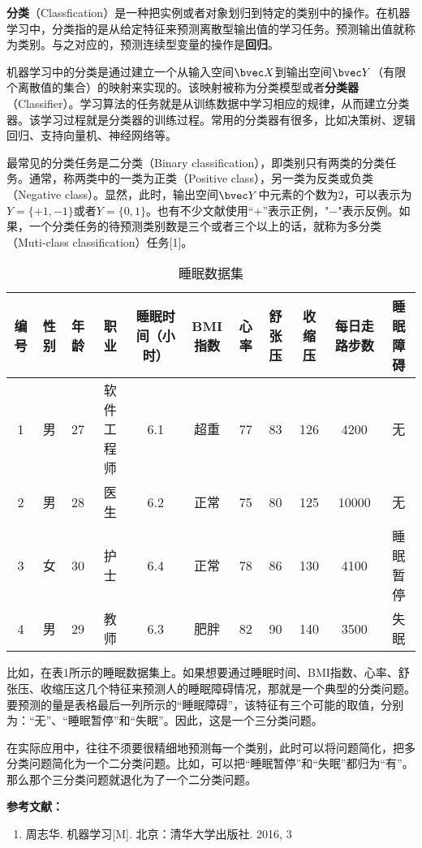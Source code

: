 

\textbf{分类}（Classfication）是一种把实例或者对象划归到特定的类别中的操作。在机器学习中，分类指的是从给定特征来预测离散型输出值的学习任务。预测输出值就称为类别。与之对应的，预测连续型变量的操作是\textbf{回归}。

机器学习中的分类是通过建立一个从输入空间$\bvec X$到输出空间$\bvec Y$（有限个离散值的集合）的映射来实现的。该映射被称为分类模型或者\textbf{分类器}（Classifier）。学习算法的任务就是从训练数据中学习相应的规律，从而建立分类器。该学习过程就是分类器的训练过程。常用的分类器有很多，比如决策树、逻辑回归、支持向量机、神经网络等。

最常见的分类任务是二分类（Binary classification），即类别只有两类的分类任务。通常，称两类中的一类为正类（Positive class），另一类为反类或负类（Negative class）。显然，此时，输出空间$\bvec Y$中元素的个数为$2$，可以表示为$Y=\{+1, -1\}$或者$Y=\{0, 1\}$。也有不少文献使用“$+$”表示正例，"$-$"表示反例。如果，一个分类任务的待预测类别数是三个或者三个以上的话，就称为多分类（Muti-class classification）任务[1]。

\begin{table}[ht]
\centering
\caption{睡眠数据集}\label{tab_Class1}
\begin{tabular}{|c|c|c|c|c|c|c|c|c|c|c|}
\hline
编号 & 性别 & 年龄 & 职业 & 睡眠时间（小时） & BMI指数 & 心率 & 舒张压 & 收缩压 & 每日走路步数 & 睡眠障碍 \\\hline
1 & 男 & 27 & 软件工程师 & 6.1 & 超重 & 77 & 83 & 126 & 4200 & 无 \\
\hline
2 & 男 & 28 & 医生 & 6.2 & 正常 & 75 & 80 & 125 & 10000 & 无 \\
\hline
3 & 女 & 30 & 护士 & 6.4 & 正常 & 78 & 86 & 130 & 4100 & 睡眠暂停 \\
\hline
4 & 男 & 29 & 教师 & 6.3 & 肥胖 & 82 & 90 & 140 & 3500 & 失眠 \\
\hline
\end{tabular}
\end{table}

比如，在表1所示的睡眠数据集上。如果想要通过睡眠时间、BMI指数、心率、舒张压、收缩压这几个特征来预测人的睡眠障碍情况，那就是一个典型的分类问题。要预测的量是表格最后一列所示的“睡眠障碍”，该特征有三个可能的取值，分别为：“无”、“睡眠暂停”和“失眠”。因此，这是一个三分类问题。

在实际应用中，往往不须要很精细地预测每一个类别，此时可以将问题简化，把多分类问题简化为一个二分类问题。比如，可以把“睡眠暂停”和“失眠”都归为“有”。那么那个三分类问题就退化为了一个二分类问题。



\textbf{参考文献：}
\begin{enumerate}
\item 周志华. 机器学习[M]. 北京：清华大学出版社. 2016, 3
\end{enumerate}